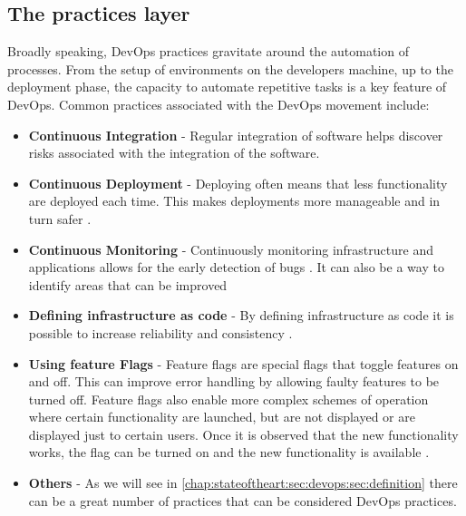       \subsection{The practices layer} \label{chap:stateoftheart:sec:devops:sec:practices}
      Broadly speaking, DevOps practices gravitate around the automation of processes. From the setup of environments on the developers machine, up to the deployment phase, the capacity to automate repetitive tasks is a key feature of DevOps.
      Common practices associated with the DevOps movement include:
      \begin{itemize}
        \item \textbf{Continuous Integration} - Regular integration of software helps discover risks associated with the integration of the software. \cite{And2015}
        \item \textbf{Continuous Deployment} - Deploying often means that less functionality are deployed each time. This makes deployments more manageable and in turn safer \cite{Allspaw}.
        \item \textbf{Continuous Monitoring} - Continuously monitoring infrastructure and applications allows for the early detection of bugs \cite{Cukier2013}. It can also be a way to identify areas that can be improved \cite{Willis2010}
        \item \textbf{Defining infrastructure as code} - By defining infrastructure as code it is possible to increase reliability and consistency \cite{Loukides2012}.
        \item \textbf{Using feature Flags} - Feature flags are special flags that toggle features on and off.  This can improve error handling by allowing faulty features to be turned off. Feature flags also enable more complex schemes of operation where certain functionality are launched, but are not displayed or are displayed just to certain users. Once it is observed that the new functionality works, the flag can be turned on and the new functionality is available \cite{Bass}.
        \item \textbf{Others} - As we will see in \ref{chap:stateoftheart:sec:devops:sec:definition} there can be a great number of practices that can be considered DevOps practices.
      \end{itemize}

